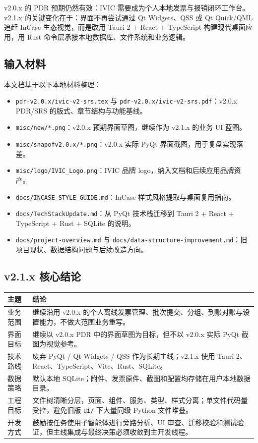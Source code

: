 \documentclass[UTF8,zihao=-4]{ctexart}
\begin{document}
v2.0.x 的 PDR 预期仍然有效：IVIC 需要成为个人本地发票与报销闭环工作台。v2.1.x 的关键变化在于：界面不再尝试通过 Qt Widgets、QSS 或 Qt Quick/QML 追赶 InCase 生态视觉，而是改用 Tauri 2 + React + TypeScript 构建现代桌面应用，用 Rust 命令层承接本地数据库、文件系统和业务逻辑。

\subsection{输入材料}

本文档基于以下本地材料整理：

\begin{itemize}
  \item \texttt{pdr-v2.0.x/ivic-v2-srs.tex} 与 \texttt{pdr-v2.0.x/ivic-v2-srs.pdf}：v2.0.x PDR/SRS 的版式、章节结构与功能基线。
  \item \texttt{misc/new/*.png}：v2.0.x 预期界面草图，继续作为 v2.1.x 的业务 UI 蓝图。
  \item \texttt{misc/snapofv2.0.x/*.png}：v2.0.x 实际 PyQt 界面截图，用于复盘实现落差。
  \item \texttt{misc/logo/IVIC\_Logo.png}：IVIC 品牌 logo，纳入文档和后续应用品牌资产。
  \item \texttt{docs/INCASE\_STYLE\_GUIDE.md}：InCase 样式风格提取与桌面复用指南。
  \item \texttt{docs/TechStackUpdate.md}：从 PyQt 技术栈迁移到 Tauri 2 + React + TypeScript + Rust + SQLite 的说明。
  \item \texttt{docs/project-overview.md} 与 \texttt{docs/data-structure-improvement.md}：旧项目现状、数据结构问题与后续改造方向。
\end{itemize}

\subsection{v2.1.x 核心结论}

\begin{longtable}{p{3.8cm}p{10.6cm}}
\toprule
主题 & 结论 \\
\midrule
业务范围 & 继续沿用 v2.0.x 的个人离线发票管理、批次提交、分组、到账对账与设置能力，不做大范围业务重写。 \\
界面目标 & 继续以 v2.0.x PDR 中的界面草图为目标，但不以 v2.0.x 实际 PyQt 截图为视觉参考。 \\
技术路线 & 废弃 PyQt / Qt Widgets / QSS 作为长期主线；v2.1.x 使用 Tauri 2、React、TypeScript、Vite、Rust、SQLite。 \\
数据策略 & 默认本地 SQLite；附件、发票原件、截图和配置均存储在用户本地数据目录。 \\
工程目标 & 文件树清晰分层，页面、组件、服务、类型、样式分离；单文件代码量受控，避免旧版 \texttt{ui/} 下大量同级 Python 文件堆叠。 \\
开发方式 & 鼓励按任务使用子智能体进行旁路分析、UI 审查、迁移校验和测试验证，但主线集成与最终决策必须收敛到主开发线程。 \\
\bottomrule
\end{longtable}
\end{document}
